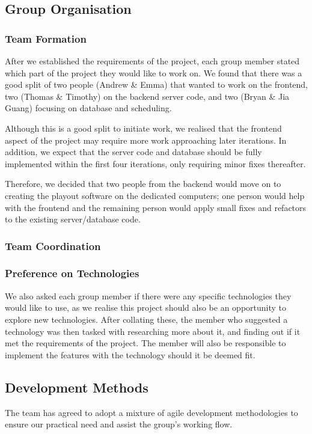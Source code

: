 ﻿\documentclass[a4paper, titlepage]{article}
\begin{document}
\subsection{Group Organisation} \label{sec:projman_group}

\subsubsection{Team Formation}
After we established the requirements of the project, each group member stated
which part of the project they would like to work on. We found that there was a
good split of two people (Andrew \& Emma) that wanted to work on the frontend,
two (Thomas \& Timothy) on the backend server code, and two (Bryan \& Jia Guang)
focusing on database and scheduling.

Although this is a good split to initiate work, we realised that the frontend 
aspect of the project may require more work approaching later iterations.
In addition, we expect that the server code and database should be fully 
implemented within the first four iterations, only requiring minor fixes thereafter.

Therefore, we decided that two people from the backend would move on to creating
the playout software on the dedicated computers; one person would help with the
frontend and the remaining person would apply small fixes and refactors to the
existing server/database code.

\subsubsection{Team Coordination}


\subsubsection{Preference on Technologies}
We also asked each group member if there were any specific technologies they 
would like to use, as we realise this project should also be an opportunity to explore new
technologies. After collating these, the member who suggested a technology was then 
tasked with researching more about it, and finding out if it met the requirements of the project.
The member will also be responsible to implement the features with the technology should it be
deemed fit.



\subsection{Development Methods} \label{sec:projman_devprocess}
The team has agreed to adopt a mixture of agile development methodologies to
ensure our practical need and assist the group's working flow.
\end{document}
